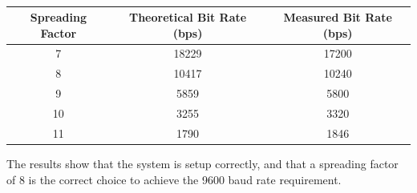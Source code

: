 \begin{table}[!htb]
  \centering
  \renewcommand{\arraystretch}{1.2}
  \begin{tabular}{ |c|c|c| }
  \hline
  \textbf{Spreading Factor}        & \textbf{Theoretical Bit Rate (bps)}      & \textbf{Measured Bit Rate (bps)}    \\
  \hline
  7         & 18229         & 17200       \\  \hline
  8         & 10417         & 10240       \\  \hline
  9         & 5859          & 5800        \\  \hline
  10        & 3255          & 3320        \\  \hline
  11        & 1790          & 1846        \\  \hline
  \end{tabular}
  \caption{}
  \label{tab:loraBitRate}
\end{table}

The results show that the system is setup correctly, and that a spreading factor of 8 is the correct choice to achieve the 9600 baud rate requirement.